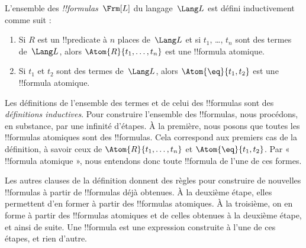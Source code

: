 \documentclass[../../../include/open-logic-section]{subfiles}
\begin{document}
\begin{defn}[Formules]
L'ensemble des \emph{!!{formula}s}~$\Frm[L]$ du langage~$\Lang L$
est défini inductivement comme suit :
\begin{enumerate}


\item Si $R$ est un !!{predicate} à $n$ places de~$\Lang L$ et si
  $t_1$, \dots, $t_n$ sont des termes de~$\Lang L$, alors
  $\Atom{R}{t_1,\ldots, t_n}$ est une !!{formula} atomique.

\item Si $t_1$ et $t_2$ sont des termes de~$\Lang L$, alors
  $\Atom{\eq}{t_1, t_2}$ est une !!{formula} atomique.








\end{enumerate}
\end{defn}

\begin{explain}
Les définitions de l'ensemble des termes et de celui des !!{formula}s
sont des \emph{définitions inductives}. Pour construire l'ensemble
des !!{formula}s, nous procédons, en substance, par une infinité
d'étapes. À la première, nous posons que toutes les !!{formula}s
atomiques sont des !!{formula}s. Cela correspond aux premiers cas de
la définition, à savoir ceux de
%
%
$\Atom{R}{t_1,\dots,t_n}$ et $\Atom{\eq}{t_1,t_2}$. Par
« !!{formula} atomique », nous entendons donc toute !!{formula}
de l'une de ces formes.

Les autres clauses de la définition donnent des règles pour construire
de nouvelles !!{formula}s à partir de !!{formula}s déjà obtenues. À
la deuxième étape, elles permettent d'en former à partir des
!!{formula}s atomiques. À la troisième, on en forme à partir des
!!{formula}s atomiques et de celles obtenues à la deuxième étape, et
ainsi de suite. Une !!{formula} est une expression construite à l'une
de ces étapes, et rien d'autre.
\end{explain}
\end{document}
